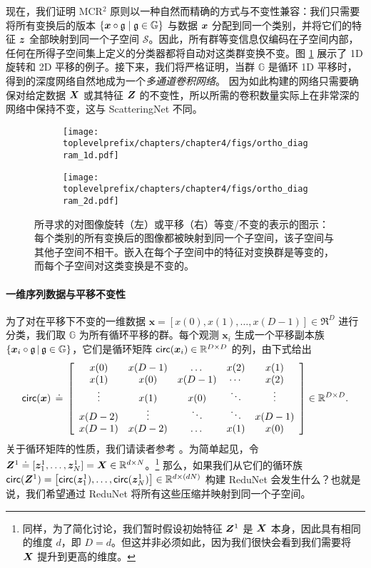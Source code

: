 \documentclass[../../book-main_zh.tex]{subfiles}
\begin{document}
现在，我们证明 MCR$^2$ 原则以一种自然而精确的方式与不变性兼容：我们只需要将所有变换后的版本 $\{\bm{x}\circ \mathfrak{g} \mid \mathfrak{g} \in \mathbb G\}$ 与数据 $\bm{x}$ 分配到同一个类别，并将它们的特征 $\bm{z}$ 全部映射到同一个子空间 $\mathcal S$。因此，所有群等变信息仅编码在子空间内部，任何在所得子空间集上定义的分类器都将自动对这类群变换不变。图 \ref{fig:ortho-invariance-diagram} 展示了 1D 旋转和 2D 平移的例子。接下来，我们将严格证明，当群 $\mathbb G$ 是循环 1D 平移时，得到的深度网络自然地成为一个{\em 多通道卷积网络}。
因为如此构建的网络只需要确保对给定数据 $\bm{X}$ 或其特征 $\bm{Z}$ 的不变性，所以所需的卷积数量实际上在非常深的网络中保持不变，这与 ScatteringNet 不同。

\begin{figure}[t]
    \begin{subfigure}[t]{0.4\textwidth}
        \centering
        \texttt{[image: \\toplevelprefix/chapters/chapter4/figs/ortho\_diagram\_1d.pdf]}
    \end{subfigure}
    \hfill
    \begin{subfigure}[t]{0.4\textwidth}
        \centering
        \texttt{[image: \\toplevelprefix/chapters/chapter4/figs/ortho\_diagram\_2d.pdf]}
    \end{subfigure}
    \caption{所寻求的对图像旋转（左）或平移（右）等变/不变的表示的图示：每个类别的所有变换后的图像都被映射到同一个子空间，该子空间与其他子空间不相干。嵌入在每个子空间中的特征对变换群是等变的，而每个子空间对这类变换是不变的。}\label{fig:ortho-invariance-diagram}
\end{figure}

\paragraph{一维序列数据与平移不变性} 为了对在平移下不变的一维数据 $\bm x = [x(0), x(1), \ldots, x(D-1)] \in \Re^D$ 进行分类，我们取 $\mathbb{G}$ 为所有循环平移的群。每个观测 $\bm x_i$ 生成一个平移副本族 $\{ \bm{x}_i \circ \mathfrak{g} \, | \, \mathfrak{g} \in \mathbb G \}$，它们是循环矩阵 $\mathsf{circ}(\bm x_i) \in \mathbb{R}^{D \times D}$ 的列，由下式给出
\begin{equation}
\mathsf{circ}(\bm{x}) \,\doteq\, \left[ \begin{array}{ccccc} x(0) & x(D-1) & \dots & x(2) & x(1) \\ x(1) & x(0) & x(D-1) & \cdots & x(2) \\ \vdots & x(1) & x(0) &\ddots & \vdots \\ x(D-2) &  \vdots & \ddots & \ddots & x(D-1) \\ x(D-1) & x(D-2) & \dots & x(1) & x(0)   \end{array} \right]  \in \mathbb{R}^{D \times D}.
\end{equation}
关于循环矩阵的性质，我们请读者参考 \cite{Kra2012OnCM}。为简单起见，令 $\bm Z^1 \doteq [ \bm{z}_{1}^1, \dots, \bm{z}_{N}^1 ] = \bm{X} \in \mathbb{R}^{d \times N}$。\footnote{同样，为了简化讨论，我们暂时假设初始特征 $\bm{Z}^1$ 是 $\bm{X}$ 本身，因此具有相同的维度 $d$，即 $D=d$。但这并非必须如此，因为我们很快会看到我们需要将 $\bm{X}$ 提升到更高的维度。} 那么，如果我们从它们的循环族 $\mathsf{circ}(\bm Z^1) = \left[ \mathsf{circ}(\bm{z}_{1}^1), \dots, \mathsf{circ}(\bm{z}_{N}^1) \right] \in \mathbb{R}^{d \times (dN)}$ 构建 ReduNet 会发生什么？也就是说，我们希望通过 ReduNet 将所有这些压缩并映射到同一个子空间。
\end{document}
